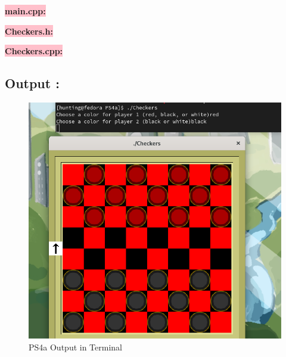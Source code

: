 \textbf{\colorbox{pink}{main.cpp:}} 


\textbf{\colorbox{pink}{Checkers.h:}} 


\textbf{\colorbox{pink}{Checkers.cpp: }} 


\subsection{Output :}
\begin{figure}[h]
   \centering
    \includegraphics[width=1\textwidth]{projectPictures/ps4a.png}
    \caption{PS4a Output in Terminal}
    \label{fig:ps4a}
\end{figure}


